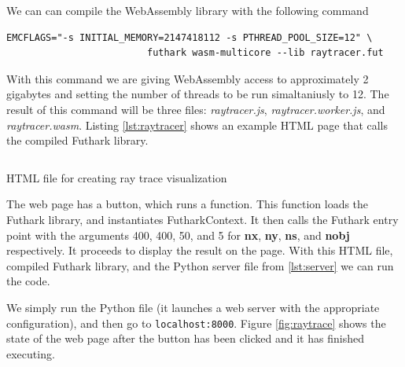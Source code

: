 \documentclass[11pt]{book}
\begin{document}
We can can compile the WebAssembly library with the following command

\begin{verbatim}
EMCFLAGS="-s INITIAL_MEMORY=2147418112 -s PTHREAD_POOL_SIZE=12" \ 
                         futhark wasm-multicore --lib raytracer.fut
\end{verbatim}

With this command we are giving WebAssembly access to approximately 2 gigabytes and setting the number of threads to be run simaltaniusly to 12. The result of this command will be three files: \textit{raytracer.js}, \textit{raytracer.worker.js}, and \textit{raytracer.wasm}. Listing \ref{lst:raytracer} shows an example HTML page that calls the compiled Futhark library.
\begin{listing}[t]    
        \inputminted[fontsize=\small,baselinestretch=0.5,linenos]{HTML}{code/examples/HTML/raytrace.js}
        \caption{HTML file for creating ray trace visualization}    
        \label{lst:raytracer}    
\end{listing} 

The web page has a button, which runs a function. This function loads the Futhark library, and instantiates FutharkContext. It then calls the Futhark entry point with the arguments 400, 400, 50, and 5 for \textbf{nx}, \textbf{ny}, \textbf{ns}, and \textbf{nobj} respectively. It proceeds to display the result on the page. With this HTML file, compiled Futhark library, and the Python server file from \ref{lst:server} we can run the code.

We simply run the Python file (it launches a web server with the appropriate configuration), and then go to \texttt{localhost:8000}. Figure \ref{fig:raytrace} shows the state of the web page after the button has been clicked and it has finished executing. 
\end{document}
